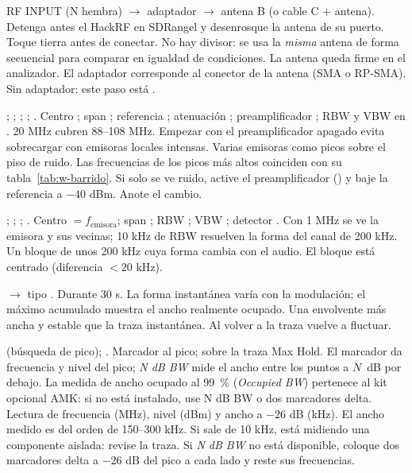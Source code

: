 {RF INPUT (N hembra) $\rightarrow$ adaptador $\rightarrow$ antena B (o cable C + antena).}
{Detenga antes el HackRF en SDRangel y desenrosque la antena de su puerto. Toque tierra antes de conectar.}
{No hay divisor: se usa la \emph{misma} antena de forma secuencial para comparar en igualdad de condiciones.}
{La antena queda firme en el analizador.}
{El adaptador corresponde al conector de la antena (SMA o RP-SMA).}
{Sin adaptador: este paso está \BLOQ.}

{; ; ; ; .}
{Centro ; span ; referencia ; atenuación ; preamplificador ; RBW y VBW en .}
{20 MHz cubren 88--108 MHz. Empezar con el preamplificador apagado evita sobrecargar con emisoras locales intensas.}
{Varias emisoras como picos sobre el piso de ruido.}
{Las frecuencias de los picos más altos coinciden con su tabla~\ref{tab:w-barrido}.}
{Si solo se ve ruido, active el preamplificador () y baje la referencia a $-40$ dBm. Anote el cambio.}

{; ; ; .}
{Centro $= f_{\mathrm{emisora}}$; span ; RBW ; VBW ; detector .}
{Con 1 MHz se ve la emisora y sus vecinas; 10 kHz de RBW resuelven la forma del canal de 200 kHz.}
{Un bloque de unos 200 kHz cuya forma cambia con el audio.}
{El bloque está centrado (diferencia $< 20$ kHz).}
{}

{ $\rightarrow$ tipo .}
{Durante 30 s.}
{La forma instantánea varía con la modulación; el máximo acumulado muestra el ancho realmente ocupado.}
{Una envolvente más ancha y estable que la traza instantánea.}
{Al volver a  la traza vuelve a fluctuar.}
{}

{ (búsqueda de pico); .}
{Marcador al pico;  sobre la traza Max Hold.}
{El marcador da frecuencia y nivel del pico; \emph{N dB BW} mide el ancho entre los puntos a $N$~dB por debajo. La medida de ancho ocupado al 99~\% (\emph{Occupied BW}) pertenece al kit opcional AMK: si no está instalado, use N dB BW o dos marcadores delta.}
{Lectura de frecuencia (MHz), nivel (dBm) y ancho a $-26$ dB (kHz).}
{El ancho medido es del orden de 150--300 kHz. Si sale de 10 kHz, está midiendo una componente aislada: revise la traza.}
{Si \emph{N dB BW} no está disponible, coloque dos marcadores delta a $-26$ dB del pico a cada lado y reste sus frecuencias.}

